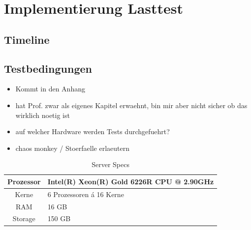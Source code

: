 \section{Implementierung Lasttest}
\subsection{Timeline}
\subsection{Testbedingungen}
\begin{itemize}
  \item Kommt in den Anhang
  \item hat Prof. zwar als eigenes Kapitel erwaehnt, bin mir aber nicht sicher ob das wirklich noetig ist
  \item auf welcher Hardware werden Tests durchgefuehrt?
  \item chaos monkey / Stoerfaelle erlaeutern
\end{itemize}

\begin{table}
  \centering
  \caption{Server Specs}
  \bigskip
  \begin{tabular}{ c l }
    \toprule
    Prozessor & Intel(R) Xeon(R) Gold 6226R CPU @ 2.90GHz \\
    \midrule
    Kerne & 6 Prozessoren á 16 Kerne \\
    \midrule
    RAM & 16 GB \\
    \midrule
    Storage & 150 GB \\
    \bottomrule
  \end{tabular}
\end{table}





   
